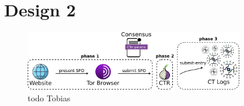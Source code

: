 \section{Design 2} \label{sec:design-log}
\begin{figure}
    \centering
    \includegraphics[width=0.85\textwidth]{img/design-log}
    \caption{todo Tobias}
    \label{fig:design-log}
\end{figure}